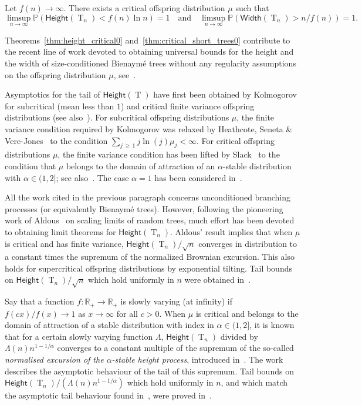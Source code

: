 \documentclass[AHL,Unicode,longabstracts,published]{cedram}
\newcommand{\R}{\mathbb{R}}
\renewcommand{\P}{\mathbb{P}}
\renewcommand{\H}{\mathsf{Height}}
\newcommand{\Width}{\mathsf{Width}}
\DeclareMathOperator{\rtree}{T}
\newcommand{\Tn}{\rtree_{n}}
\begin{document}
\begin{theo}\label{thm:critical_short_trees0}
Let $f(n)\to \infty$. There exists a critical offspring distribution $\mu$ such that
\[
\limsup_{n\to \infty} \P\left(\H(\rtree_{n})<f(n)\ln n\right)=1
\quad \text{and} \quad
\limsup_{n\to \infty} \P\left(\Width(\rtree_{n})> n/f(n)\right)=1.
\]
\end{theo}

Theorems~\ref{thm:height_critical0} and~\ref{thm:critical_short_trees0} contribute to the recent line of work devoted to obtaining universal bounds for the height and the width of size-conditioned Bienaymé trees without any regularity assumptions on the offspring distribution $\mu$, see~\cite{Add19,ABHK21,AD22}.

Asymptotics for the tail of $\H(\rtree)$ have first been obtained by Kolmogorov \cite{Kol38} for subcritical (mean less than $1$) and critical finite variance offspring distributions (see also~\cite[Eq.~(9.5) and~(10.8)]{Har63}). For subcritical offspring distributions $\mu$, the finite variance condition required by Kolmogorov was relaxed by Heathcote, Seneta \& Vere-Jones~\cite{HSV67} to the condition $\sum_{j\,\geq\,1} j \ln(j) \mu_{j} < \infty$. For critical offspring distributions $\mu$, the finite variance condition has been lifted by Slack~\cite{Sla68} to the condition that $\mu$ belongs to the domain of attraction of an $\alpha$-stable distribution with $\alpha \in (1,2]$; see also~\cite{BS71}. The case $\alpha=1$ has been considered in~\cite{LS08,NW07,Sze76}.

All the work cited in the previous paragraph concerns unconditioned branching processes (or equivalently Bienaymé trees). However, following the pioneering work of Aldous~\cite{Ald93} on scaling limits of random trees, much effort has been devoted to obtaining limit theorems for $\H(\Tn)$. Aldous' result implies that when $\mu$ is critical and has finite variance, $\H(\Tn)/\sqrt{n}$ converges in distribution to a constant times the supremum of the normalized Brownian excursion. This also holds for supercritical offspring distributions by exponential tilting. Tail bounds on $\H(\Tn)/\sqrt{n}$ which hold uniformly in $n$ were obtained in~\cite{ADS13}.

Say that a function $f:\R_{+} \to \R_{+}$ is slowly varying (at infinity) if $f(cx)/f(x) \to 1$ as $x \to \infty$ for all $c > 0$. When $\mu$ is critical and belongs to the domain of attraction of a stable distribution with index in $\alpha \in (1,2]$, it is known~\cite{Duq03,Kor13} that for a certain slowly varying function $\Lambda$, $\H(\Tn)$ divided by $\Lambda(n) n^{1-1/\alpha}$ converges to a constant multiple of the supremum of the so-called \emph{normalised excursion of the $\alpha$-stable height process}, introduced in~\cite{LL98}. The work~\cite[Theorem~1.5]{DW17} describes the asymptotic behaviour of the tail of this supremum. Tail bounds on $\H(\Tn)/(\Lambda(n) n^{1-1/\alpha})$ which hold uniformly in $n$, and which match the asymptotic tail behaviour found in~\cite{DW17}, were proved in~\cite{Kor17}.
\end{document}
